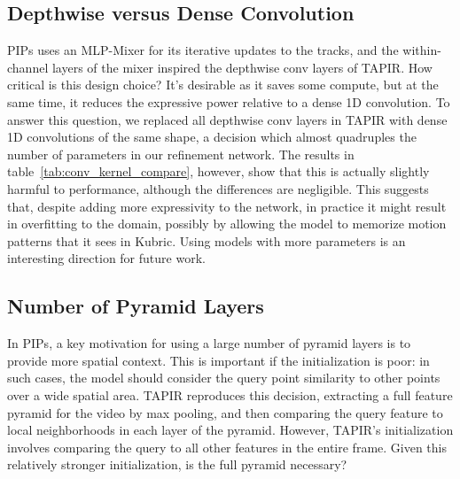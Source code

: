 \documentclass[10pt,twocolumn,letterpaper]{article}
\begin{document}
\subsection{Depthwise versus Dense Convolution}

PIPs uses an MLP-Mixer for its iterative updates to the tracks, and the within-channel layers of the mixer inspired the depthwise conv layers of TAPIR.  How critical is this design choice?  It's desirable as it saves some compute, but at the same time, it reduces the expressive power relative to a dense 1D convolution.  To answer this question, we replaced all depthwise conv layers in TAPIR with dense 1D convolutions of the same shape, a decision which almost quadruples the number of parameters in our refinement network.  The results in table~\ref{tab:conv_kernel_compare}, however, show that this is actually slightly harmful to performance, although the differences are negligible.  This suggests that, despite adding more expressivity to the network, in practice it might result in overfitting to the domain, possibly by allowing the model to memorize motion patterns that it sees in Kubric.  Using models with more parameters is an interesting direction for future work.

\begin{table}[t]
\caption{\textbf{Comparison on number of feature pyramid levels.} We find that the number of pyramid levels makes relatively little difference in performance; in fact, 3 pyramid levels seems to be all that's required, and even 2 levels gives competitive performance.}
\label{tab:pyramid_level_compare}
\end{table}

\subsection{Number of Pyramid Layers}
\label{sec:pyramid_layers}
In PIPs, a key motivation for using a large number of pyramid layers is to provide more spatial context.  This is important if the initialization is poor: in such cases, the model should consider the query point similarity to other points over a wide spatial area.  TAPIR reproduces this decision, extracting a full feature pyramid for the video by max pooling, and then comparing the query feature to local neighborhoods in each layer of the pyramid.  However, TAPIR's initialization involves comparing the query to all other features in the entire frame.  Given this relatively stronger initialization, is the full pyramid necessary?  
\end{document}
